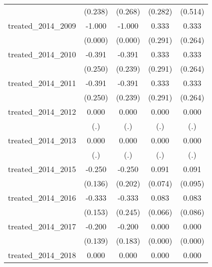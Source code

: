 {\begin{tabular}{l*{4}{c}}
            &     (0.238)         &     (0.268)         &     (0.282)         &     (0.514)         \\
[1em]
treated\_2014\_2009&      -1.000\sym{***}&      -1.000\sym{***}&       0.333         &       0.333         \\
            &     (0.000)         &     (0.000)         &     (0.291)         &     (0.264)         \\
[1em]
treated\_2014\_2010&      -0.391         &      -0.391         &       0.333         &       0.333         \\
            &     (0.250)         &     (0.239)         &     (0.291)         &     (0.264)         \\
[1em]
treated\_2014\_2011&      -0.391         &      -0.391         &       0.333         &       0.333         \\
            &     (0.250)         &     (0.239)         &     (0.291)         &     (0.264)         \\
[1em]
treated\_2014\_2012&       0.000         &       0.000         &       0.000         &       0.000         \\
            &         (.)         &         (.)         &         (.)         &         (.)         \\
[1em]
treated\_2014\_2013&       0.000         &       0.000         &       0.000         &       0.000         \\
            &         (.)         &         (.)         &         (.)         &         (.)         \\
[1em]
treated\_2014\_2015&      -0.250         &      -0.250         &       0.091         &       0.091         \\
            &     (0.136)         &     (0.202)         &     (0.074)         &     (0.095)         \\
[1em]
treated\_2014\_2016&      -0.333\sym{*}  &      -0.333         &       0.083         &       0.083         \\
            &     (0.153)         &     (0.245)         &     (0.066)         &     (0.086)         \\
[1em]
treated\_2014\_2017&      -0.200         &      -0.200         &       0.000         &       0.000         \\
            &     (0.139)         &     (0.183)         &     (0.000)         &     (0.000)         \\
[1em]
treated\_2014\_2018&       0.000         &       0.000         &       0.000         &       0.000         \\

\end{tabular}}
